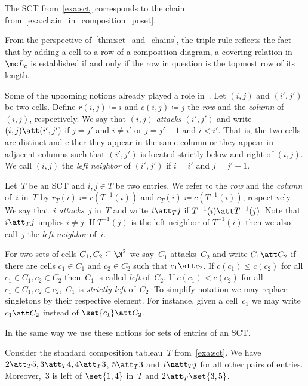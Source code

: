 \begin{exam}
	The SCT from~\cref{exa:sct} 	corresponds to the chain from~\cref{exa:chain_in_composition_poset}.	
\end{exam}

From the perspective of~\cref{thm:sct_and_chains}, the triple rule reflects the fact that by adding a cell to a row of a composition diagram, a covering relation in $\mc L_c$ is established if and only if the row in question is the topmost row of its length.

Some of the upcoming notions already played a role in~\cite{Tewari2015}.
Let $(i,j)$ and $(i',j')$ be two cells.
Define $r(i,j) \coloneqq i$ and $c(i,j) \coloneqq j$ the \emph{row} and the \emph{column} of $(i,j)$, respectively. 
We say that $(i,j)$ \emph{attacks} $(i',j')$ and write $(i,j)\att (i',j')$ if $j=j'$ and $i\neq i'$ or $j = j'-1$ and $i<i'$.
That is, the two cells are distinct and either they appear in the same column or they appear in adjacent columns such that $(i',j')$ is located strictly below and right of $(i,j)$.
We call $(i,j)$ the \emph{left neighbor} of $(i',j')$ if $i=i'$ and $j = j'-1$.

Let~$T$ be an SCT and $i,j\in T$ be two entries.
We refer to the \emph{row} and the \emph{column} of~$i$ in~$T$ by $r_T(i) \coloneqq r(T^{-1}(i))$ and $c_T(i)\coloneqq c(T^{-1}(i))$, respectively. 
We say that~$i$ \emph{attacks}~$j$ in~$T$ and write $i\att_T j$ if $T^{-1}(i) \att T^{-1}(j)$.
Note that $i\att_T j$ implies $i\neq j$. 
If $T^{-1}(j)$ is the left neighbor of $T^{-1}(i)$ then we also call~$j$ the \emph{left neighbor} of~$i$.

For two sets of cells $C_1, C_2 \subseteq \N^2$ we say~$C_1$ attacks~$C_2$ and write $C_1 \att C_2$ if there are cells $c_1\in C_1$ and $c_2 \in C_2$ such that $c_1 \att c_2$. 
If $c(c_1)\leq c(c_2)$ for all $c_1\in C_1, c_2\in C_2$ then~$C_1$ is called \emph{left} of~$C_2$. If $c(c_1)< c(c_2)$ for all $c_1\in C_1, c_2\in c_2$,~$C_1$ is \emph{strictly left} of~$C_2$.
To simplify notation we may replace singletons by their respective element.
For instance, given a cell~$c_1$ we may write $c_1 \att C_2$ instead of $\set{c_1} \att C_2$.

In the same way we use these notions for sets of entries of an SCT.

\begin{exam}
		Consider the standard composition tableau~$T$ from~\cref{exa:sct}. We have $2\att_T 5, 3\att_T 4, 4\att_T 3$, $5\att_T 3$ and $i\natt_T j$ for all other pairs of entries. Moreover,~$3$ is left of $\set{1,4}$ in~$T$ and $2\att_T \set{3,5}$.
\end{exam}

